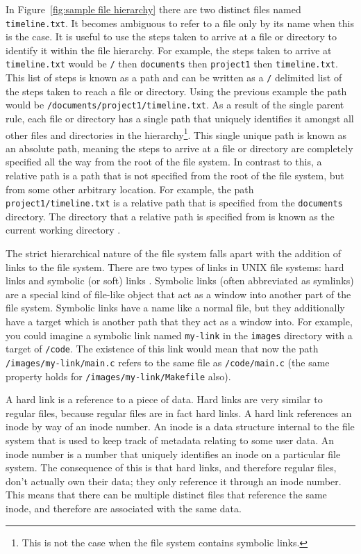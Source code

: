 In Figure~\ref{fig:sample file hierarchy} there are two distinct files named
\texttt{timeline.txt}. It becomes ambiguous to refer to a file only by its name
when this is the case. It is useful to use the steps taken to arrive at a file
or directory to identify it within the file hierarchy. For example, the steps
taken to arrive at \texttt{timeline.txt} would be \texttt{/} then
\texttt{documents} then \texttt{project1} then \texttt{timeline.txt}. This list
of steps is known as a path and can be written as a \texttt{/} delimited list
of the steps taken to reach a file or directory. Using the previous example the
path would be \texttt{/documents/project1/timeline.txt}. As a result of the
single parent rule, each file or directory has a single path that uniquely
identifies it amongst all other files and directories in the
hierarchy\footnote{This is not the case when the file system contains symbolic
links.}. This single unique path is known as an absolute path, meaning the
steps to arrive at a file or directory are completely specified all the way
from the root of the file system. In contrast to this, a relative path is a
path that is not specified from the root of the file system, but from some
other arbitrary location. For example, the path \texttt{project1/timeline.txt}
is a relative path that is specified from the \texttt{documents} directory. The
directory that a relative path is specified from is known as the current
working directory \cite{unix-intro}.

The strict hierarchical nature of the file system falls apart with the addition
of links to the file system. There are two types of links in UNIX file systems:
hard links \cite{link} and symbolic (or soft) links \cite{symlink}. Symbolic
links (often abbreviated as symlinks) are a special kind of file-like object
that act as a window into another part of the file system. Symbolic links have
a name like a normal file, but they additionally have a target which is another
path that they act as a window into. For example, you could imagine a symbolic
link named \texttt{my-link} in the \texttt{images} directory with a target of
\texttt{/code}. The existence of this link would mean that now the path
\texttt{/images/my-link/main.c} refers to the same file as
\texttt{/code/main.c} (the same property holds for
\texttt{/images/my-link/Makefile} also). 

A hard link is a reference to a piece of data. Hard links are very similar to
regular files, because regular files are in fact hard links. A hard link
references an inode \cite{inode} by way of an inode number. An inode is a data
structure internal to the file system that is used to keep track of metadata
relating to some user data. An inode number is a number that uniquely
identifies an inode on a particular file system. The consequence of this is
that hard links, and therefore regular files, don't actually own their data;
they only reference it through an inode number. This means that there can be
multiple distinct files that reference the same inode, and therefore are
associated with the same data.

